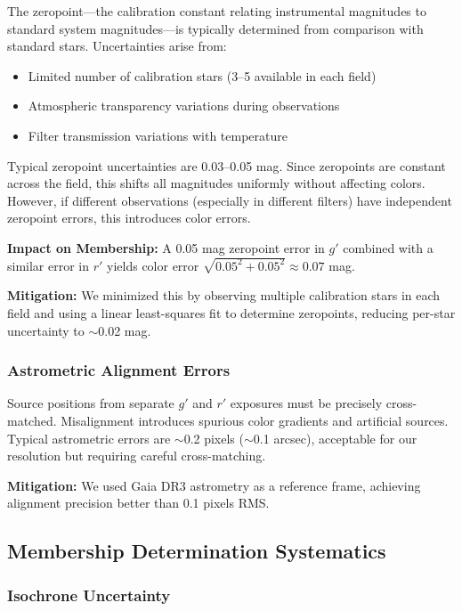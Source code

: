 \documentclass[linenumbers,trackchanges,twocolumn]{aastex701}
\begin{document}
The zeropoint---the calibration constant relating instrumental magnitudes to standard system magnitudes---is typically determined from comparison with standard stars. Uncertainties arise from:
\begin{itemize}
\item Limited number of calibration stars (3--5 available in each field)
\item Atmospheric transparency variations during observations
\item Filter transmission variations with temperature
\end{itemize}

Typical zeropoint uncertainties are 0.03--0.05 mag. Since zeropoints are constant across the field, this shifts all magnitudes uniformly without affecting colors. However, if different observations (especially in different filters) have independent zeropoint errors, this introduces color errors.

\textbf{Impact on Membership:} A 0.05 mag zeropoint error in $g'$ combined with a similar error in $r'$ yields color error $\sqrt{0.05^2 + 0.05^2} \approx 0.07$ mag.

\textbf{Mitigation:} We minimized this by observing multiple calibration stars in each field and using a linear least-squares fit to determine zeropoints, reducing per-star uncertainty to $\sim$0.02 mag.

\subsubsection{Astrometric Alignment Errors}

Source positions from separate $g'$ and $r'$ exposures must be precisely cross-matched. Misalignment introduces spurious color gradients and artificial sources. Typical astrometric errors are $\sim$0.2 pixels ($\sim$0.1 arcsec), acceptable for our resolution but requiring careful cross-matching.

\textbf{Mitigation:} We used Gaia DR3 astrometry as a reference frame, achieving alignment precision better than 0.1 pixels RMS.

\subsection{Membership Determination Systematics}

\subsubsection{Isochrone Uncertainty}
\end{document}
